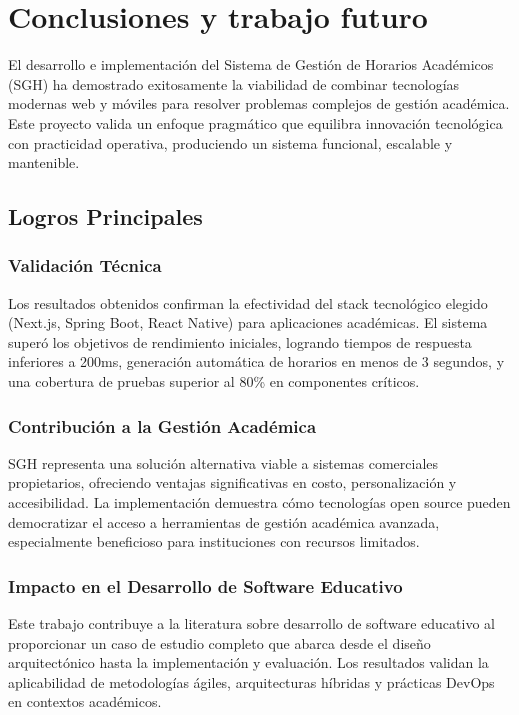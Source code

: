 \section{Conclusiones y trabajo futuro}

El desarrollo e implementación del Sistema de Gestión de Horarios Académicos (SGH) ha demostrado exitosamente la viabilidad de combinar tecnologías modernas web y móviles para resolver problemas complejos de gestión académica. Este proyecto valida un enfoque pragmático que equilibra innovación tecnológica con practicidad operativa, produciendo un sistema funcional, escalable y mantenible.

\subsection{Logros Principales}

\subsubsection{Validación Técnica}
Los resultados obtenidos confirman la efectividad del stack tecnológico elegido (Next.js, Spring Boot, React Native) para aplicaciones académicas. El sistema superó los objetivos de rendimiento iniciales, logrando tiempos de respuesta inferiores a 200ms, generación automática de horarios en menos de 3 segundos, y una cobertura de pruebas superior al 80\% en componentes críticos.

\subsubsection{Contribución a la Gestión Académica}
SGH representa una solución alternativa viable a sistemas comerciales propietarios, ofreciendo ventajas significativas en costo, personalización y accesibilidad. La implementación demuestra cómo tecnologías open source pueden democratizar el acceso a herramientas de gestión académica avanzada, especialmente beneficioso para instituciones con recursos limitados.

\subsubsection{Impacto en el Desarrollo de Software Educativo}
Este trabajo contribuye a la literatura sobre desarrollo de software educativo al proporcionar un caso de estudio completo que abarca desde el diseño arquitectónico hasta la implementación y evaluación. Los resultados validan la aplicabilidad de metodologías ágiles, arquitecturas híbridas y prácticas DevOps en contextos académicos.

